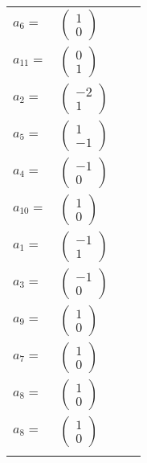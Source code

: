 \documentclass[1p]{elsarticle_modified}
\theoremstyle{definition}
\begin{document}
\begin{tabular}{m{7pt} m{180pt} m{7pt} m{180pt} }
\flushright $a_{6}=$&$\begin{pmatrix}1\\0\end{pmatrix}$ \\
\flushright $a_{11}=$&$\begin{pmatrix}0\\1\end{pmatrix}$ \\
\flushright $a_{2}=$&$\begin{pmatrix}-2\\1\end{pmatrix}$ \\
\flushright $a_{5}=$&$\begin{pmatrix}1\\-1\end{pmatrix}$ \\
\flushright $a_{4}=$&$\begin{pmatrix}-1\\0\end{pmatrix}$ \\
\flushright $a_{10}=$&$\begin{pmatrix}1\\0\end{pmatrix}$ \\
\flushright $a_{1}=$&$\begin{pmatrix}-1\\1\end{pmatrix}$ \\
\flushright $a_{3}=$&$\begin{pmatrix}-1\\0\end{pmatrix}$ \\
\flushright $a_{9}=$&$\begin{pmatrix}1\\0\end{pmatrix}$ \\
\flushright $a_{7}=$&$\begin{pmatrix}1\\0\end{pmatrix}$ \\
\flushright $a_{8}=$&$\begin{pmatrix}1\\0\end{pmatrix}$\\ \flushright $a_{8}=$&$\begin{pmatrix}1\\0\end{pmatrix}$\\&\end{tabular}
\end{document}
